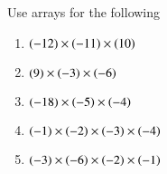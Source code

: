 Use arrays for the following
\begin{enumerate}[label=\thesection.\arabic*, ref=\thesubsection.\theenumi,resume*]
	\item $(-12)\times  \left(-11\right)\times \left(10\right) $
	\item $(9)\times\left(-3\right) \times \left(-6\right)$ 
	\item $(-18)\times\left(-5\right) \times \left(-4\right)$ 
	\item $(-1)\times\left(-2\right) \times \left(-3\right) \times \left(-4\right)$ 
	\item $(-3)\times\left(-6\right) \times \left(-2\right) \times \left(-1\right)$ 
\end{enumerate}
